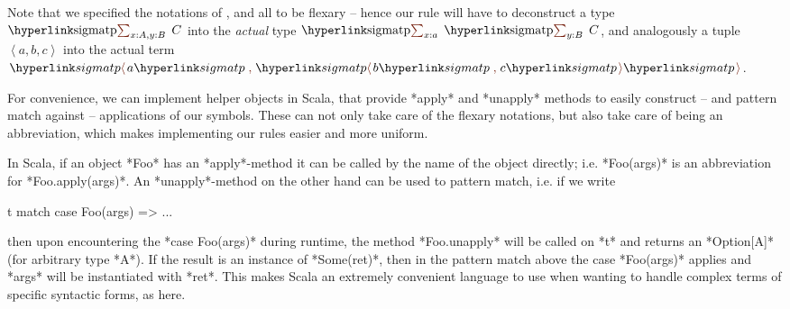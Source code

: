 Note that we specified the notations of ,  and  all to be flexary -- hence our rule will have to deconstruct a type $\sigmatp{x : A, y : B}C$ into the \emph{actual} type $\sigmatp{x : a}{\sigmatp{y : B}C}$, and analogously a tuple $\left\langle a, b,c\right\rangle$ into the actual term $\pair a{\pair bc}$.

For convenience, we can implement helper objects in Scala, that provide *apply* and *unapply* methods to easily construct -- and pattern match against -- applications of our symbols. These can not only take care of the flexary notations, but also take care of   being an abbreviation, which makes implementing our rules easier and more uniform. 


\begin{remark}
In Scala, if an object *Foo* has an *apply*-method it can be called by the name of the object directly; i.e. *Foo(args)* is an abbreviation for *Foo.apply(args)*. An *unapply*-method on the other hand can be used to pattern match, i.e. if we write
\begin{center}\begin{scalacode}
t match {
	case Foo(args) =>
	...
}
\end{scalacode}\end{center}
then upon encountering the *case Foo(args)* during runtime, the method *Foo.unapply* will be called on *t* and returns an *Option[A]* (for arbitrary type *A*). If the result is an instance of *Some(ret)*, then in the pattern match above the case *Foo(args)* applies and *args* will be instantiated with *ret*. This makes Scala an extremely convenient language to use when wanting to handle complex terms of specific syntactic forms, as here.
\end{remark}

